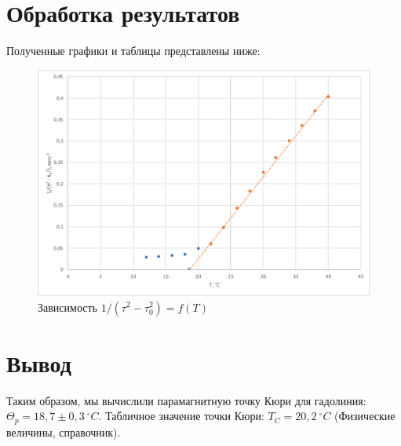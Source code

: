 \documentclass[a4paper,12pt]{article}
\begin{document}
	\section*{Обработка результатов}
		Полученные графики и таблицы представлены ниже:
		\begin{figure}[H]
			\label{2}
			\caption{Зависимость $ 1 /\left(\tau^{2}-\tau_{0}^{2}\right)=f(T) $}
			\includegraphics[scale=0.6]{2.pdf}
		\end{figure}
		
		\section*{Вывод}
			Таким образом, мы вычислили парамагнитную точку Кюри для гадолиния: $ \Theta_p=18,7\pm0,3\:^\circ C $. Табличное значение точки Кюри: $ T_C = 20,2\:^\circ C $ (Физические величины, справочник).
			
\end{document}
